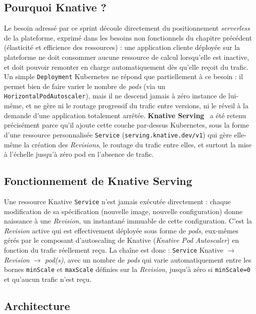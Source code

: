 \subsection{Pourquoi Knative ?}

Le besoin adressé par ce sprint découle directement du positionnement \textit{serverless} de la plateforme, exprimé dans les besoins non fonctionnels du chapitre précédent (élasticité et efficience des ressources) : une application cliente déployée sur la plateforme ne doit consommer aucune ressource de calcul lorsqu'elle est inactive, et doit pouvoir remonter en charge automatiquement dès qu'elle reçoit du trafic. Un simple \texttt{Deployment} Kubernetes ne répond que partiellement à ce besoin : il permet bien de faire varier le nombre de \textit{pods} (via un \texttt{HorizontalPodAutoscaler}), mais il ne descend jamais à zéro instance de lui-même, et ne gère ni le routage progressif du trafic entre versions, ni le réveil à la demande d'une application totalement arrêtée. \textbf{Knative Serving}~\citep{KnativeServingDoc} a été retenu précisément parce qu'il ajoute cette couche par-dessus Kubernetes, sous la forme d'une ressource personnalisée \texttt{Service} (\texttt{serving.knative.dev/v1}) qui gère elle-même la création des \textit{Revisions}, le routage du trafic entre elles, et surtout la mise à l'échelle jusqu'à zéro pod en l'absence de trafic.

\subsection{Fonctionnement de Knative Serving}

Une ressource Knative \texttt{Service} n'est jamais exécutée directement : chaque modification de sa spécification (nouvelle image, nouvelle configuration) donne naissance à une \textit{Revision}, un instantané immuable de cette configuration. C'est la \textit{Revision} active qui est effectivement déployée sous forme de \textit{pods}, eux-mêmes gérés par le composant d'autoscaling de Knative (\textit{Knative Pod Autoscaler}) en fonction du trafic réellement reçu. La chaîne est donc : \texttt{Service} Knative $\rightarrow$ \textit{Revision} $\rightarrow$ \textit{pod(s)}, avec un nombre de \textit{pods} qui varie automatiquement entre les bornes \texttt{minScale} et \texttt{maxScale} définies sur la \textit{Revision}, jusqu'à zéro si \texttt{minScale=0} et qu'aucun trafic n'est reçu.

\subsection{Architecture}

